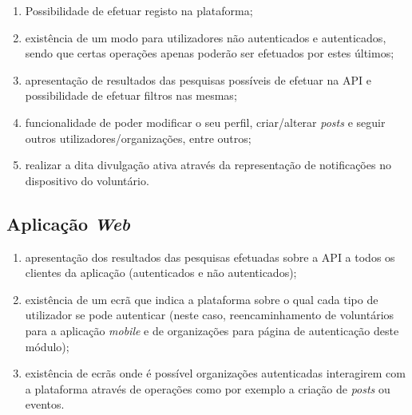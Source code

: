 \begin{enumerate}
	\item Possibilidade de efetuar registo na plataforma;
	\item existência de um modo para utilizadores não autenticados e autenticados, sendo que certas operações apenas poderão ser efetuados por estes últimos;
	\item apresentação de resultados das pesquisas possíveis de efetuar na API e possibilidade de efetuar filtros nas mesmas;
	\item funcionalidade de poder modificar o seu perfil, criar/alterar \textit{posts} e seguir outros utilizadores/organizações, entre outros;
	\item realizar a dita divulgação ativa através da representação de notificações no dispositivo do voluntário.
\end{enumerate}

\subsection*{Aplicação \textit{Web}}

\begin{enumerate}
	\item apresentação dos resultados das pesquisas efetuadas sobre a API a todos os clientes da aplicação (autenticados e não autenticados);
	\item existência de um ecrã que indica a plataforma sobre o qual cada tipo de utilizador se pode autenticar (neste caso, reencaminhamento de voluntários para a aplicação \textit{mobile} e de organizações para página de autenticação deste módulo);
	\item existência de ecrãs onde é possível organizações autenticadas interagirem com a plataforma através de operações como por exemplo a criação de \textit{posts} ou eventos.
\end{enumerate}